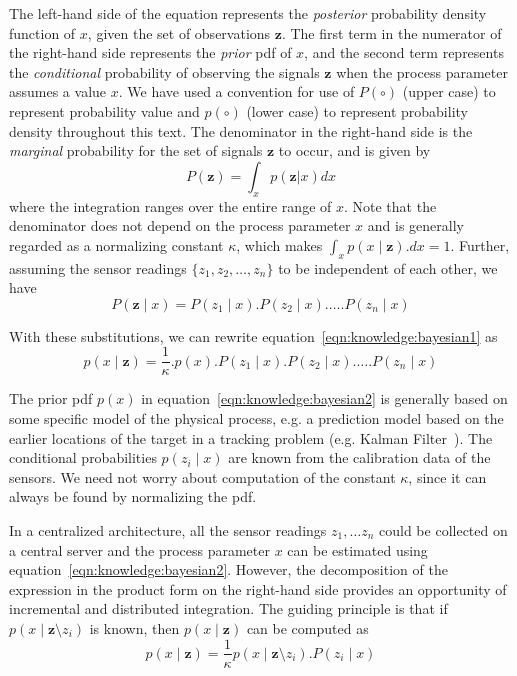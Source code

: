 \noindent
The left-hand side of the equation represents the {\em posterior} probability density function of $x$, given the set of observations
$\mathbf{z}$. 
%
The first term in the numerator of the right-hand side represents the {\em prior} pdf of $x$, and the second 
term represents the {\em conditional} probability of observing the signals $\mathbf{z}$ when the process parameter assumes a value 
$x$. We have used a convention for use of $P(\circ)$ (upper case) to represent probability value and $p(\circ)$ (lower case) 
to represent probability density throughout this text. 
%
The denominator in the right-hand side is the {\em marginal} probability for the set of signals $\mathbf{z}$ to occur, and is given by
\begin{equation}
	P(\mathbf{z}) = \int_x p( \mathbf{z} | x )dx
\end{equation}
\noindent
where the integration ranges over the entire range of $x$. Note that the denominator does not depend on the process parameter $x$
and is generally regarded as a normalizing constant $\kappa$, which makes $\int_x p(x \mid \mathbf{z}).dx = 1$. 
%
Further, assuming the sensor readings $\{z_1, z_2, \dots, z_n\}$ to be independent of each other, we have
\begin{equation}
	P(\mathbf{z} \mid x) = P(z_1 \mid x).P(z_2 \mid x). \dots .P(z_n \mid x)
\end{equation}

\noindent
With these substitutions, we can rewrite equation~\ref{eqn:knowledge:bayesian1} as
\begin{equation}
	p( x \mid \mathbf{z} ) = \frac{1}{\kappa}. p(x).P(z_1 \mid x).P(z_2 \mid x). \dots .P(z_n \mid x)
	\label{eqn:knowledge:bayesian2}
\end{equation}

\noindent
The prior pdf $p(x)$ in equation~\ref{eqn:knowledge:bayesian2} is generally based on some specific model of the physical process,
e.g. a prediction model based on the earlier locations of the target in a tracking problem (e.g. Kalman Filter~\citep{Welch:1995}).
The conditional probabilities $p(z_i \mid x)$ are known from the calibration data of the sensors. We need not worry about
computation of the constant $\kappa$, since it can always be found by normalizing the pdf.

In a centralized architecture, all the sensor readings $z_1, \dots z_n$ could be collected on a central server and the process
parameter $x$ can be estimated using equation~\ref{eqn:knowledge:bayesian2}. However, the decomposition of the expression in the product 
form on the right-hand side provides an opportunity of incremental and distributed integration. The guiding principle is that
if $p(x \mid \mathbf{z} \setminus z_i)$ is known, then $p(x \mid \mathbf{z})$ can be computed as
\begin{equation}
	p( x \mid \mathbf{z} ) 
		= \frac{1}{\kappa}p(x \mid \mathbf{z}\setminus z_i).P(z_i \mid x)
	\label{eqn:knowledge:bayesian3}
\end{equation}

